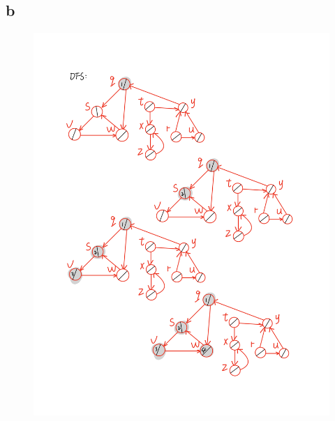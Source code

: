 \documentclass[12pt,a4paper,fontset=none]{ctexart}
\begin{document}
\subsection{b}
\begin{figure}[H]
    \centering
    \includegraphics[width=1\linewidth]{IMG_0122.PNG}
\end{figure}
\end{document}
